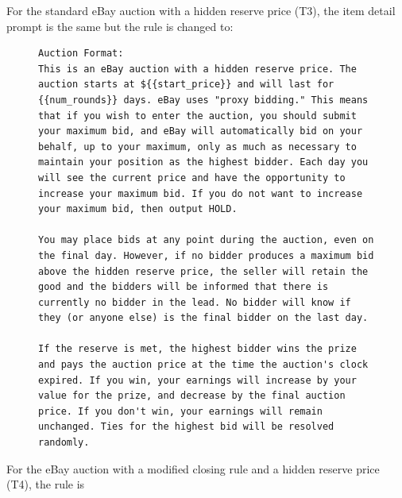 For the standard eBay auction with a hidden reserve price (T3), the item detail prompt is the same but the rule is changed to:
\begin{figure}[H]
\centering
\begin{minipage}{0.95\textwidth}
\begin{lstlisting}
Auction Format:
This is an eBay auction with a hidden reserve price. The auction starts at ${{start_price}} and will last for {{num_rounds}} days. eBay uses "proxy bidding." This means that if you wish to enter the auction, you should submit your maximum bid, and eBay will automatically bid on your behalf, up to your maximum, only as much as necessary to maintain your position as the highest bidder. Each day you will see the current price and have the opportunity to increase your maximum bid. If you do not want to increase your maximum bid, then output HOLD.

You may place bids at any point during the auction, even on the final day. However, if no bidder produces a maximum bid above the hidden reserve price, the seller will retain the good and the bidders will be informed that there is currently no bidder in the lead. No bidder will know if they (or anyone else) is the final bidder on the last day.

If the reserve is met, the highest bidder wins the prize and pays the auction price at the time the auction's clock expired. If you win, your earnings will increase by your value for the prize, and decrease by the final auction price. If you don't win, your earnings will remain unchanged. Ties for the highest bid will be resolved randomly.
\end{lstlisting}
\end{minipage}
\label{fig:sealbid_prompt}
\end{figure}

For the eBay auction with a modified closing rule and a hidden reserve price (T4), the rule is

